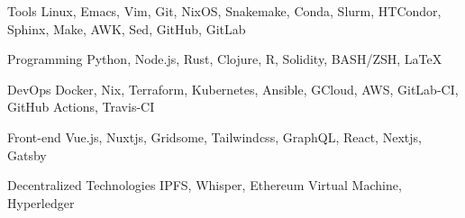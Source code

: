 
\begin{cvskills}

	\cvskill
	{Tools} %
	{Linux, Emacs, Vim, Git, NixOS, Snakemake, Conda, Slurm, HTCondor, Sphinx, Make, AWK, Sed, GitHub, GitLab} %

	\cvskill
	{Programming} %
	{Python, Node.js, Rust, Clojure, R, Solidity, BASH/ZSH, LaTeX} %

	\cvskill
	{DevOps} %
	{Docker, Nix, Terraform, Kubernetes, Ansible, GCloud, AWS, GitLab-CI,  GitHub Actions, Travis-CI} %

	\cvskill
	{Front-end} %
	{Vue.js, Nuxtjs, Gridsome, Tailwindcss, GraphQL, React, Nextjs, Gatsby } %

	\cvskill
	{Decentralized Technologies} %
	{IPFS, Whisper, Ethereum Virtual Machine, Hyperledger} %


\end{cvskills}
